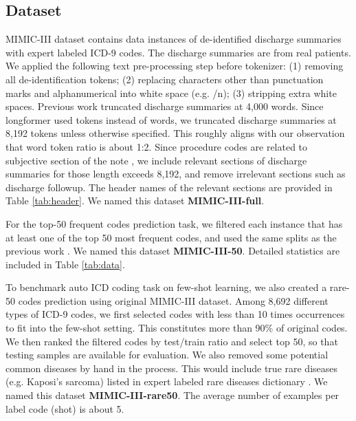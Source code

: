 \documentclass[11pt]{article}
\begin{document}
\subsection{Dataset}

MIMIC-III dataset \citep{Johnson2016MIMICIIIAF} contains data instances of de-identified discharge summaries with expert labeled ICD-9 codes. The discharge summaries are from real patients. We applied the following text pre-processing step before tokenizer: (1) removing all de-identification tokens; (2) replacing characters other than punctuation marks and alphanumerical into white space (e.g. /n); (3) stripping extra white spaces. 
Previous work \citep{Mullenbach2018ExplainablePO} truncated discharge summaries at 4,000 words. Since longformer used tokens instead of words, we truncated discharge summaries at 8,192 tokens unless otherwise specified. This roughly aligns with our observation that word token ratio is about 1:2. Since procedure codes are related to subjective section of the note \citep{yang-yu-2020-generating}, we include relevant sections of discharge summaries for those length exceeds 8,192, and remove irrelevant sections such as discharge followup. The header names of the relevant sections are provided in Table \ref{tab:header}. We named this dataset \textbf{MIMIC-III-full}.

For the top-50 frequent codes prediction task, we filtered each instance that has at least one of the top 50 most frequent codes, and used the same splits as the previous work \citep{Vu2020ALA, Yuan2022CodeSD}. We named this dataset \textbf{MIMIC-III-50}. Detailed statistics are included in Table \ref{tab:data}.

To benchmark auto ICD coding task on few-shot learning, we also created a rare-50 codes prediction using  original MIMIC-III dataset. Among 8,692 different types of ICD-9 codes, we first selected codes with less than 10 times occurrences to fit into the few-shot setting. This constitutes more than 90\% of original codes. We then ranked the filtered codes by test/train ratio and select top 50, so that testing samples are available for evaluation.
We also removed some potential common diseases by hand in the process. This would include true rare diseases (e.g. Kaposi's sarcoma) listed in expert labeled rare diseases dictionary \citep{Pavan2017ClinicalPG, NguengangWakap2019EstimatingCP}. We named this dataset \textbf{MIMIC-III-rare50}. The average number of examples per label code (shot) is about 5. 
\end{document}
